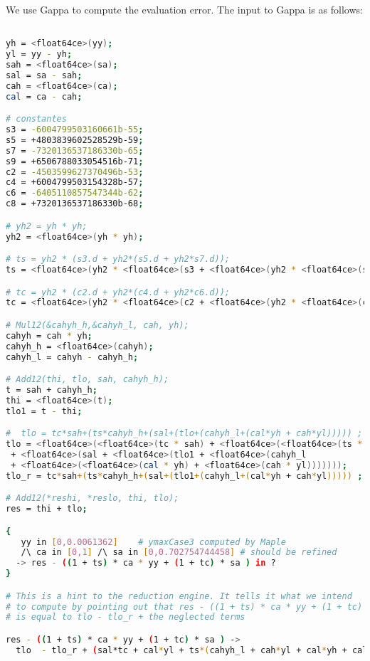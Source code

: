 We use Gappa to compute the evaluation error.
The input to Gappa is as follows:
\begin{lstlisting}[caption={Gappa input to compute the error of DoSineNotZero},
  language={sh}, numbers=none]
%Skip a line here, I don't know why, otherwise latex eats the first line

yh = <float64ce>(yy);
yl = yy - yh;
sah = <float64ce>(sa);
sal = sa - sah;
cah = <float64ce>(ca);
cal = ca - cah;

# constantes
s3 = -6004799503160661b-55;
s5 = +4803839602528529b-59;
s7 = -7320136537186330b-65;
s9 = +6506788033054516b-71;
c2 = -4503599627370496b-53;
c4 = +6004799503154328b-57;
c6 = -6405110857547344b-62;
c8 = +7320136537186330b-68;

# yh2 = yh * yh;
yh2 = <float64ce>(yh * yh);

# ts = yh2 * (s3.d + yh2*(s5.d + yh2*s7.d));
ts = <float64ce>(yh2 * <float64ce>(s3 + <float64ce>(yh2 * <float64ce>(s5 + <float64ce>(yh2 * s7)))));

# tc = yh2 * (c2.d + yh2*(c4.d + yh2*c6.d));
tc = <float64ce>(yh2 * <float64ce>(c2 + <float64ce>(yh2 * <float64ce>(c4 + <float64ce>(yh2 * c6)))));

# Mul12(&cahyh_h,&cahyh_l, cah, yh);
cahyh = cah * yh;
cahyh_h = <float64ce>(cahyh);
cahyh_l = cahyh - cahyh_h;

# Add12(thi, tlo, sah, cahyh_h);
t = sah + cahyh_h;
thi = <float64ce>(t);
tlo1 = t - thi;

#  tlo = tc*sah+(ts*cahyh_h+(sal+(tlo+(cahyh_l+(cal*yh + cah*yl))))) ;
tlo = <float64ce>(<float64ce>(tc * sah) + <float64ce>(<float64ce>(ts * cahyh_h)
 + <float64ce>(sal + <float64ce>(tlo1 + <float64ce>(cahyh_l
 + <float64ce>(<float64ce>(cal * yh) + <float64ce>(cah * yl)))))));
tlo_r = tc*sah+(ts*cahyh_h+(sal+(tlo1+(cahyh_l+(cal*yh + cah*yl))))) ;

# Add12(*reshi, *reslo, thi, tlo);
res = thi + tlo;

{
   yy in [0,0.0061362]    # ymaxCase3 computed by Maple
   /\ ca in [0,1] /\ sa in [0,0.702754744458] # should be refined
  -> res - ((1 + ts) * ca * yy + (1 + tc) * sa ) in ?
}

# This is a hint to the reduction engine. It tells it what we intend
# to compute by pointing out that res - ((1 + ts) * ca * yy + (1 + tc) * sa ) 
# is equal to tlo - tlo_r + the neglected terms

res - ((1 + ts) * ca * yy + (1 + tc) * sa ) ->
  tlo  - tlo_r + (sal*tc + cal*yl + ts*(cahyh_l + cah*yl + cal*yh + cal*yl)) ;
\end{lstlisting}

